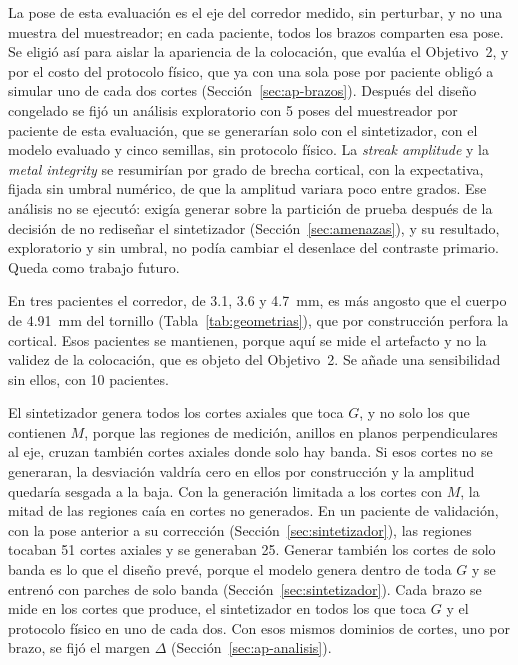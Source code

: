 La pose de esta evaluación es el eje del corredor medido, sin perturbar, y no una muestra del muestreador; en cada paciente, todos los brazos comparten esa pose. Se eligió así para aislar la apariencia de la colocación, que evalúa el Objetivo~2, y por el costo del protocolo físico, que ya con una sola pose por paciente obligó a simular uno de cada dos cortes (Sección~\ref{sec:ap-brazos}). Después del diseño congelado se fijó un análisis exploratorio con 5 poses del muestreador por paciente de esta evaluación, que se generarían solo con el sintetizador, con el modelo evaluado y cinco semillas, sin protocolo físico. La \emph{streak amplitude} y la \emph{metal integrity} se resumirían por grado de brecha cortical, con la expectativa, fijada sin umbral numérico, de que la amplitud variara poco entre grados. Ese análisis no se ejecutó: exigía generar sobre la partición de prueba después de la decisión de no rediseñar el sintetizador (Sección~\ref{sec:amenazas}), y su resultado, exploratorio y sin umbral, no podía cambiar el desenlace del contraste primario. Queda como trabajo futuro.

En tres pacientes el corredor, de 3.1, 3.6 y 4.7~mm, es más angosto que el cuerpo de 4.91~mm del tornillo (Tabla~\ref{tab:geometrias}), que por construcción perfora la cortical. Esos pacientes se mantienen, porque aquí se mide el artefacto y no la validez de la colocación, que es objeto del Objetivo~2. Se añade una sensibilidad sin ellos, con 10 pacientes.

El sintetizador genera todos los cortes axiales que toca $G$, y no solo los que contienen $M$, porque las regiones de medición, anillos en planos perpendiculares al eje, cruzan también cortes axiales donde solo hay banda. Si esos cortes no se generaran, la desviación valdría cero en ellos por construcción y la amplitud quedaría sesgada a la baja. Con la generación limitada a los cortes con $M$, la mitad de las regiones caía en cortes no generados. En un paciente de validación, con la pose anterior a su corrección (Sección~\ref{sec:sintetizador}), las regiones tocaban 51 cortes axiales y se generaban 25. Generar también los cortes de solo banda es lo que el diseño prevé, porque el modelo genera dentro de toda $G$ y se entrenó con parches de solo banda (Sección~\ref{sec:sintetizador}). Cada brazo se mide en los cortes que produce, el sintetizador en todos los que toca $G$ y el protocolo físico en uno de cada dos. Con esos mismos dominios de cortes, uno por brazo, se fijó el margen $\Delta$ (Sección~\ref{sec:ap-analisis}).

